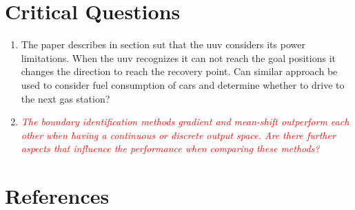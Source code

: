 \documentclass[oneside, notitlepage, twocolumn]{scrartcl}
\newcommand{\draft}[1]{\textcolor{red}{\textit{#1}}}
\begin{document}
\section{Critical Questions}
\begin{enumerate}
    \item The paper describes in section \gls{sut} that the \gls{uuv} considers its power limitations.
        When the \gls{uuv} recognizes it can not reach the goal positions it changes the direction to reach the recovery point.
        Can similar approach be used to consider fuel consumption of cars and determine whether to drive to the next gas station?
    \item \draft{The boundary identification methods gradient and mean-shift outperform each other when having a continuous or discrete output space.
        Are there further aspects that influence the performance when comparing these methods?}
\end{enumerate}

\section{References}
\begingroup
\renewcommand{\section}[2]{}%
\nocite{*}
\printbibliography%
\endgroup
\end{document}
